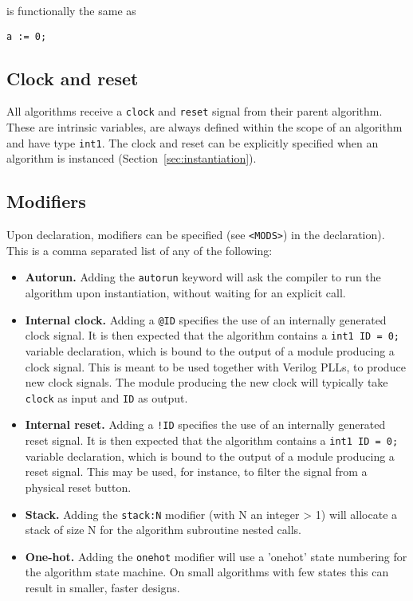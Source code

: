 \documentclass[a4]{article}
\newcommand\verilog{Verilog}
\begin{document}
\noindent is functionally the same as

\begin{verbatim}
a := 0;
\end{verbatim}


\subsection{Clock and reset}

All algorithms receive a \texttt{clock} and \texttt{reset} signal from their
parent algorithm. These are intrinsic variables, are always defined within
the scope of an algorithm and have type \texttt{int1}. The clock and reset
can be explicitly specified when an algorithm is instanced (Section~\ref{sec:instantiation}).


\subsection{Modifiers}

Upon declaration, modifiers can be specified (see \texttt{<MODS>}) in the declaration). This is a comma separated list of any of the following:

\begin{itemize}
	\item \textbf{Autorun.} Adding the \texttt{autorun} keyword will ask the compiler to run the algorithm upon instantiation, without waiting for an explicit call.
	\item \textbf{Internal clock.} Adding a \texttt{@ID} specifies the use of an internally generated clock signal. It is then expected that the algorithm contains a \texttt{int1 ID = 0;} variable declaration, which is bound to the output of a module producing a clock signal. This is meant to be used together with \verilog{} PLLs, to produce new clock signals. The module producing the new clock will typically take \texttt{clock} as input and \texttt{ID}
	as output.
	\item \textbf{Internal reset.} Adding a \texttt{!ID} specifies the use of an internally generated reset signal. It is then expected that the algorithm contains a \texttt{int1 ID = 0;} variable declaration, which is bound to the output of a module producing a reset signal. This may be used, for instance, to filter the signal from a physical reset button.
	\item \textbf{Stack.} Adding the \texttt{stack:N} modifier (with N an integer > 1) will allocate a stack of size N for the algorithm subroutine nested calls.
	\item \textbf{One-hot.} Adding the \texttt{onehot} modifier will use a 'onehot' state numbering for the algorithm state machine. On small algorithms with few states this can result in smaller, faster designs.
\end{itemize}
\end{document}
